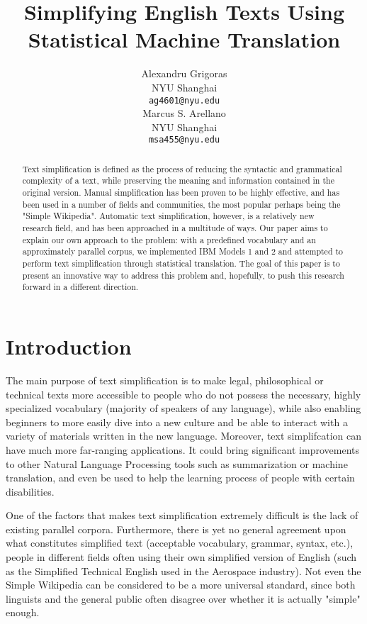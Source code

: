 \documentclass[11pt]{article}
\title{Simplifying English Texts Using Statistical Machine Translation}
\author{Alexandru Grigoras \\
  NYU Shanghai \\
  {\tt ag4601@nyu.edu} \\\And
  Marcus S. Arellano \\
  NYU Shanghai \\
  {\tt msa455@nyu.edu} \\}
\date{}
\begin{document}
\maketitle
\begin{abstract}
  Text simplification is defined as the process of reducing the syntactic and grammatical complexity of a text, while preserving the meaning and information contained in the original version. Manual simplification has been proven to be highly effective, and has been used in a number of fields and communities, the most popular perhaps being the "Simple Wikipedia". Automatic text simplification, however, is a relatively new research field, and has been approached in a multitude of ways. Our paper aims to explain our own approach to the problem: with a predefined vocabulary and an approximately parallel corpus, we implemented IBM Models 1 and 2 and attempted to perform text simplification through statistical translation. The goal of this paper is to present an innovative way to address this problem and, hopefully, to push this research forward in a different direction.
\end{abstract}

\section{Introduction}

The main purpose of text simplification is to make legal, philosophical or technical texts more accessible to people who do not possess the necessary, highly specialized vocabulary (majority of speakers of any language), while also enabling beginners to more easily dive into a new culture and be able to interact with a variety of materials written in the new language. Moreover, text simplifcation can have much more far-ranging applications. It could bring significant improvements to other Natural Language Processing tools such as summarization or machine translation, and even be used to help the learning process of people with certain disabilities.

One of the factors that makes text simplification extremely difficult is the lack of existing parallel corpora. Furthermore, there is yet no general agreement upon what constitutes simplified text (acceptable vocabulary, grammar, syntax, etc.), people in different fields often using their own simplified version of English (such as the Simplified Technical English used in the Aerospace industry). Not even the Simple Wikipedia can be considered to be a more universal standard, since both linguists and the general public often disagree over whether it is actually "simple" enough.
\end{document}
